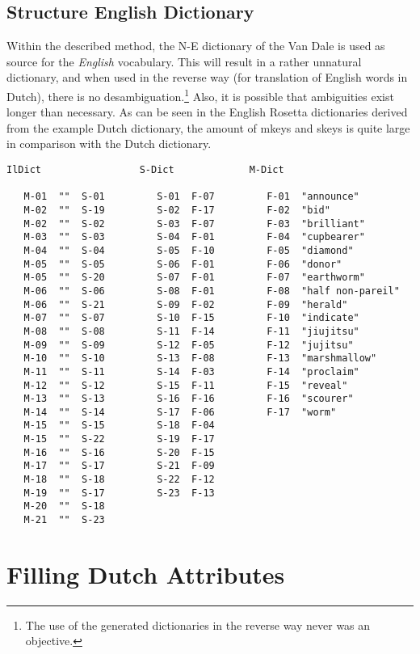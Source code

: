 \subsection{Structure English Dictionary}
Within the described method, the N-E dictionary of the Van Dale is used 
as source for the {\em English} vocabulary. This will result in a rather 
unnatural 
dictionary, and when used in the reverse way (for translation of English words
in Dutch), there is no desambiguation.\footnote{The use of the generated 
dictionaries in the reverse way never was an objective.} Also, it is possible 
that ambiguities 
exist longer than necessary. As can be seen in the English Rosetta dictionaries 
derived from the example Dutch dictionary, the amount of mkeys and skeys is 
quite large in comparison with the Dutch dictionary.
 
\begin{verbatim}
IlDict                 S-Dict             M-Dict
 
   M-01  ""  S-01         S-01  F-07         F-01  "announce"
   M-02  ""  S-19         S-02  F-17         F-02  "bid"
   M-02  ""  S-02         S-03  F-07         F-03  "brilliant"
   M-03  ""  S-03         S-04  F-01         F-04  "cupbearer"
   M-04  ""  S-04         S-05  F-10         F-05  "diamond"
   M-05  ""  S-05         S-06  F-01         F-06  "donor"
   M-05  ""  S-20         S-07  F-01         F-07  "earthworm"
   M-06  ""  S-06         S-08  F-01         F-08  "half non-pareil"
   M-06  ""  S-21         S-09  F-02         F-09  "herald"
   M-07  ""  S-07         S-10  F-15         F-10  "indicate"
   M-08  ""  S-08         S-11  F-14         F-11  "jiujitsu"
   M-09  ""  S-09         S-12  F-05         F-12  "jujitsu"
   M-10  ""  S-10         S-13  F-08         F-13  "marshmallow"
   M-11  ""  S-11         S-14  F-03         F-14  "proclaim"
   M-12  ""  S-12         S-15  F-11         F-15  "reveal"
   M-13  ""  S-13         S-16  F-16         F-16  "scourer"
   M-14  ""  S-14         S-17  F-06         F-17  "worm"
   M-15  ""  S-15         S-18  F-04
   M-15  ""  S-22         S-19  F-17
   M-16  ""  S-16         S-20  F-15
   M-17  ""  S-17         S-21  F-09
   M-18  ""  S-18         S-22  F-12
   M-19  ""  S-17         S-23  F-13
   M-20  ""  S-18
   M-21  ""  S-23
\end{verbatim}
 
\newpage
\section{Filling Dutch Attributes}
 
